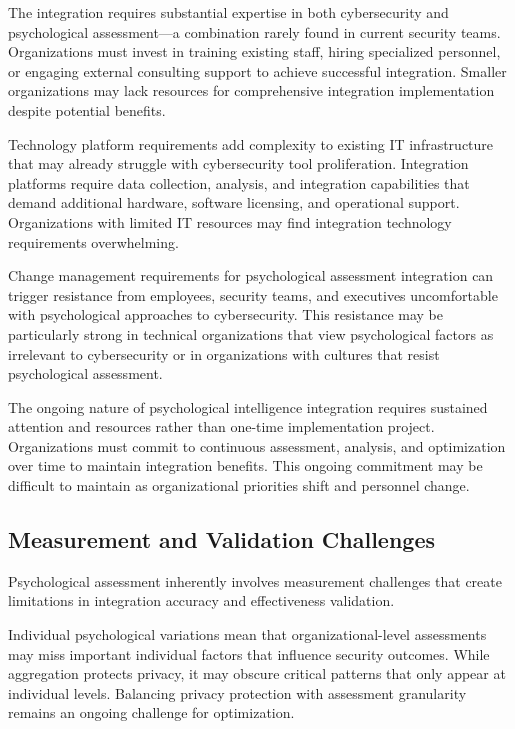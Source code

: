 \documentclass[10pt, twocolumn]{article}
\begin{document}
The integration requires substantial expertise in both cybersecurity and psychological assessment—a combination rarely found in current security teams. Organizations must invest in training existing staff, hiring specialized personnel, or engaging external consulting support to achieve successful integration. Smaller organizations may lack resources for comprehensive integration implementation despite potential benefits.

Technology platform requirements add complexity to existing IT infrastructure that may already struggle with cybersecurity tool proliferation. Integration platforms require data collection, analysis, and integration capabilities that demand additional hardware, software licensing, and operational support. Organizations with limited IT resources may find integration technology requirements overwhelming.

Change management requirements for psychological assessment integration can trigger resistance from employees, security teams, and executives uncomfortable with psychological approaches to cybersecurity. This resistance may be particularly strong in technical organizations that view psychological factors as irrelevant to cybersecurity or in organizations with cultures that resist psychological assessment.

The ongoing nature of psychological intelligence integration requires sustained attention and resources rather than one-time implementation project. Organizations must commit to continuous assessment, analysis, and optimization over time to maintain integration benefits. This ongoing commitment may be difficult to maintain as organizational priorities shift and personnel change.

\subsection{Measurement and Validation Challenges}

Psychological assessment inherently involves measurement challenges that create limitations in integration accuracy and effectiveness validation.

Individual psychological variations mean that organizational-level assessments may miss important individual factors that influence security outcomes. While aggregation protects privacy, it may obscure critical patterns that only appear at individual levels. Balancing privacy protection with assessment granularity remains an ongoing challenge for optimization.
\end{document}
